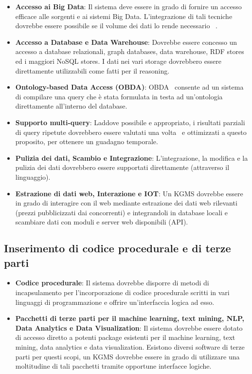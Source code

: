 \begin{itemize}
	\item \textbf{Accesso ai Big Data}: Il sistema deve essere in grado di fornire un accesso efficace alle sorgenti e ai sistemi Big Data. L'integrazione di tali tecniche dovrebbe essere possibile se il volume dei dati lo rende necessario ~\cite{shkapsky2016big}.
	\item \textbf{Accesso a Database e Data Warehouse}: Dovrebbe essere concesso un accesso a database relazionali, graph databases, data warehouse, RDF stores ed i maggiori NoSQL stores. I dati nei vari storage dovrebbero essere direttamente utilizzabili come fatti per il reasoning.
	\item \textbf{Ontology-based Data Access (OBDA)}: OBDA~\cite{calvanese2011mastro} consente ad un sistema di compilare una query che è stata formulata in testa ad un'ontologia direttamente all'interno del database.
	\item \textbf{Supporto multi-query}: Laddove possibile e appropriato, i risultati parziali di query ripetute dovrebbero essere valutati una volta~\cite{roy2000efficient} e ottimizzati a questo proposito, per ottenere un guadagno temporale.
	\item \textbf{Pulizia dei dati, Scambio e Integrazione}: L'integrazione, la modifica e la pulizia dei dati dovrebbero essere supportati direttamente (attraverso il linguaggio).
	\item \textbf{Estrazione di dati web, Interazione e IOT}: Un KGMS dovrebbe essere in grado di interagire con il web mediante estrazione dei dati web rilevanti (prezzi pubblicizzati dai concorrenti) e integrandoli in database locali e scambiare dati con moduli e server web disponibili (API).
\end{itemize}

\subsection{Inserimento di codice procedurale e di terze parti}

\begin{itemize}
	\item \textbf{Codice procedurale}: Il sistema dovrebbe disporre di metodi di incapsulamento per l'incorporazione di codice procedurale scritti in vari linguaggi di programmazione e offrire un'interfaccia logica ad esso.
	\item \textbf{Pacchetti di terze parti per il machine learning, text mining, NLP, Data Analytics e Data Visualization}: Il sistema dovrebbe essere dotato di accesso diretto a potenti package esistenti per il machine learning, text mining, data analytics e data visualization. Esistono diversi software di terze parti per questi scopi, un KGMS dovrebbe essere in grado di utilizzare una moltitudine di tali pacchetti tramite opportune interfacce logiche.
\end{itemize}

